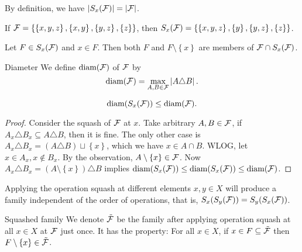 \begin{remark}
    By definition, we have $|S_x(\mathcal{F})|=|\mathcal{F}|$.
\end{remark}

\begin{example}[exp:]{}
    If $\mathcal{F}=\left\{\left\{x,y,z\right\},\left\{x,y\right\},\left\{y,z\right\},\left\{z\right\}\right\}$, then $S_x(\mathcal{F})=\left\{\left\{x,y,z\right\},\left\{y\right\},\left\{y,z\right\},\left\{z\right\}\right\}$.
\end{example}

\begin{observation}[obv:]{}
    Let $F\in S_x(\mathcal{F})$ and $x\in F$. Then both $F$ and $F\setminus \left\{x\right\}$ are members of $\mathcal{F}\cap S_x(\mathcal{F})$.
\end{observation}

\begin{definition}[def:]{Diameter}
    We define  $\textnormal{diam}(\mathcal{F})$ of $\mathcal{F}$ by
    \[\textnormal{diam}(\mathcal{F})=\max_{A,B\in \mathcal{F}}\left|A\triangle B\right|.\]
\end{definition}

\begin{proposition}[pps:]{}
    \[\textnormal{diam}(S_x(\mathcal{F}))\leq \textnormal{diam}(\mathcal{F}).\]
\end{proposition}

\begin{proof}
    Consider the squash of $\mathcal{F}$ at $x$. Take arbitrary $A,B\in \mathcal{F}$, if $A_x\triangle B_x\subseteq A\triangle B$, then it is fine. The only other case is $A_x\triangle B_x=(A\triangle B)\sqcup\left\{x\right\}$, which we have $x\in A\cap B$. WLOG, let $x\in A_x, x\notin B_x$. By the observation, $A\setminus \left\{x\right\}\in \mathcal{F}$. Now $A_x\triangle B_x=(A\setminus \left\{x\right\})\triangle B$ implies $\textnormal{diam}(S_x(\mathcal{F}))\leq \textnormal{diam}(S_x(\mathcal{F}))\leq \textnormal{diam}(\mathcal{F})$.
\end{proof}

\begin{remark}
    Applying the operation squash at different elements $x,y\in X$ will produce a family independent of the order of operations, that is, $S_x(S_y(\mathcal{F}))=S_y(S_x(\mathcal{F}))$.
\end{remark}

\begin{definition}[def:]{Squashed family}
    We denote $\tilde{\mathcal{F}}$ be the family after applying operation squash at all $x\in X$ at $\mathcal{F}$ just once. It has the property: 
    For all $x\in X$, if $x\in F\subseteq \tilde{\mathcal{F}}$ then $F\setminus \left\{x\right\}\in \tilde{\mathcal{F}}$.
\end{definition}

